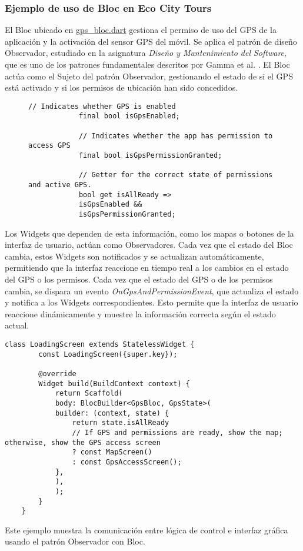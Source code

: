 	\subsubsection{Ejemplo de uso de Bloc en Eco City Tours}
	El Bloc ubicado en \href{project-app/project_app/lib/blocs/gps/gps_bloc.dart}{gps\_bloc.dart} gestiona el permiso de uso del GPS de la aplicación y la activación del sensor GPS del móvil. 
	Se aplica el patrón de diseño Observador, estudiado en la asignatura \textit{Diseño y Mantenimiento del Software}, que es uno de los patrones fundamentales descritos por Gamma et al. \cite{gamma2002}.
	El Bloc actúa como el Sujeto del patrón Observador, gestionando el estado de si el GPS está activado y si los permisos de ubicación han sido concedidos.
	
	\begin{figure}[htbp] %
		\centering
		\begin{lstlisting}[caption={Definición de variables de control en el Bloc}]
			// Indicates whether GPS is enabled
			final bool isGpsEnabled;
			
			// Indicates whether the app has permission to access GPS
			final bool isGpsPermissionGranted;
			
			// Getter for the correct state of permissions and active GPS.
			bool get isAllReady =>
			isGpsEnabled &&
			isGpsPermissionGranted;
		\end{lstlisting}
	\end{figure}
	Los Widgets que dependen de esta información, como los mapas o botones de la interfaz de usuario, actúan como Observadores. Cada vez que el estado del Bloc cambia, estos Widgets son notificados y se actualizan automáticamente, permitiendo que la interfaz reaccione en tiempo real a los cambios en el estado del GPS o los permisos.
	Cada vez que el estado del GPS o de los permisos cambia, se dispara un evento \textit{OnGpsAndPermissionEvent}, que actualiza el estado y notifica a los Widgets correspondientes. Esto permite que la interfaz de usuario reaccione dinámicamente y muestre la información correcta según el estado actual.
	
	\begin{lstlisting}[caption={Carga en función del estado}]
	class LoadingScreen extends StatelessWidget {
		const LoadingScreen({super.key});
		
		@override
		Widget build(BuildContext context) {
			return Scaffold(
			body: BlocBuilder<GpsBloc, GpsState>(
			builder: (context, state) {
				return state.isAllReady 
				// If GPS and permissions are ready, show the map; otherwise, show the GPS access screen
				? const MapScreen()
				: const GpsAccessScreen();
			},
			),
			);
		}
	}
	\end{lstlisting}	
	Este ejemplo muestra la comunicación entre lógica de control e interfaz gráfica usando el patrón Observador con Bloc.
	
